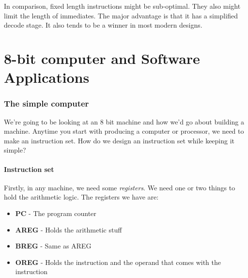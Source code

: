 \documentclass[11pt,a4paper,titlepage,dvipsnames,cmyk]{scrartcl}
\begin{document}
In comparison, fixed length instructions might be sub-optimal. They also
might limit the length of immediates. The major advantage is that it has
a simplified decode stage. It also tends to be a winner in most modern
designs.

\newpage
\part{8-bit computer and Software Applications}
\section{The simple computer}%
\label{sec:Compilers}
We're going to be looking at an 8 bit machine and how we'd go about
building a machine. Anytime you start with producing a computer or
processor, we need to make an instruction set. How do we design an
instruction set while keeping it simple?

\subsection{Instruction set}%
\label{sub:Instruction set}
Firstly, in any machine, we need some \textit{registers}. We need one or
two things to hold the arithmetic logic. The registers we have are:
\begin{itemize}
    \item \textbf{PC} - The program counter
    \item \textbf{AREG} - Holds the arithmetic stuff
    \item \textbf{BREG} - Same as AREG
    \item \textbf{OREG} - Holds the instruction and the operand that comes
        with the instruction
\end{itemize}
\end{document}
